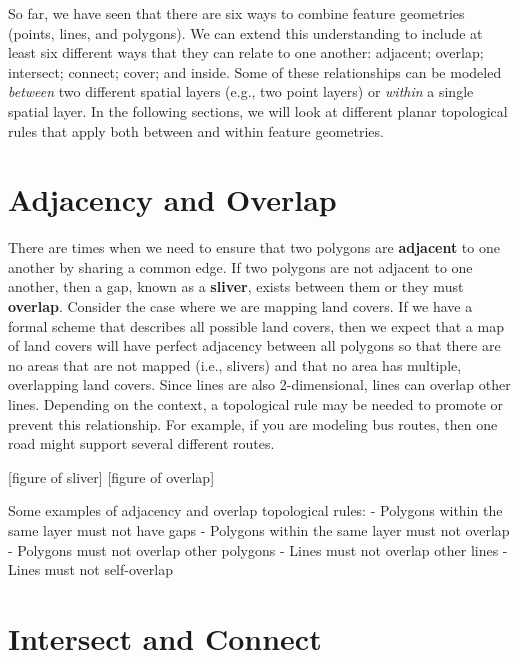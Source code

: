 \documentclass[
]{book}
\begin{document}
So far, we have seen that there are six ways to combine feature geometries (points, lines, and polygons). We can extend this understanding to include at least six different ways that they can relate to one another: adjacent; overlap; intersect; connect; cover; and inside. Some of these relationships can be modeled \emph{between} two different spatial layers (e.g., two point layers) or \emph{within} a single spatial layer. In the following sections, we will look at different planar topological rules that apply both between and within feature geometries.

\hypertarget{adjacency-and-overlap}{%
\section{Adjacency and Overlap}\label{adjacency-and-overlap}}

There are times when we need to ensure that two polygons are \textbf{adjacent} to one another by sharing a common edge. If two polygons are not adjacent to one another, then a gap, known as a \textbf{sliver}, exists between them or they must \textbf{overlap}. Consider the case where we are mapping land covers. If we have a formal scheme that describes all possible land covers, then we expect that a map of land covers will have perfect adjacency between all polygons so that there are no areas that are not mapped (i.e., slivers) and that no area has multiple, overlapping land covers. Since lines are also 2-dimensional, lines can overlap other lines. Depending on the context, a topological rule may be needed to promote or prevent this relationship. For example, if you are modeling bus routes, then one road might support several different routes.

{[}figure of sliver{]}
{[}figure of overlap{]}

Some examples of adjacency and overlap topological rules:
- Polygons within the same layer must not have gaps
- Polygons within the same layer must not overlap
- Polygons must not overlap other polygons
- Lines must not overlap other lines
- Lines must not self-overlap

\hypertarget{intersect-and-connect}{%
\section{Intersect and Connect}\label{intersect-and-connect}}
\end{document}
